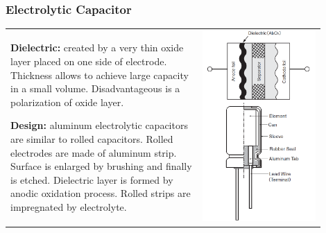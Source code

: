\documentclass{beamer}
\begin{document}
	\begin{frame}
    \frametitle{Electrolytic Capacitor}
		\small
		\begin{tabular}{m{0.55\linewidth}m{0.35\linewidth}}
		\begin{flushleft}
		\textbf{Dielectric:} created by a very thin oxide layer placed on one side of electrode. Thickness allows to achieve large capacity in a small volume. Disadvantageous is a polarization of oxide layer.
		\end{flushleft}
		\begin{flushleft}
		\textbf{Design:} aluminum electrolytic capacitors are similar to rolled capacitors. Rolled electrodes are made of aluminum strip. Surface is enlarged by brushing and finally is etched. Dielectric layer is formed by anodic oxidation process. Rolled strips are impregnated by electrolyte.
		\end{flushleft}
		& \includegraphics[scale=0.25]{obr12_elektrolyt.png}
		\end{tabular}
  \end{frame}
\end{document}
